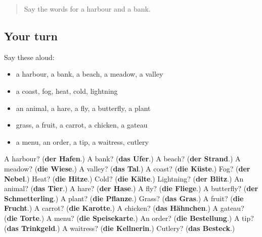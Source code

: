 \label{lesson:GE-R200-second-pass-words-from-chapters-196-200}



\begin{quote}
Say the words for a harbour and a bank.
\end{quote}

\subsection*{Your turn}
Say these aloud:

\begin{itemize}
\raggedright
  \item a harbour, a bank, a beach, a meadow, a valley
  \item a coast, fog, heat, cold, lightning
  \item an animal, a hare, a fly, a butterfly, a plant
  \item grass, a fruit, a carrot, a chicken, a gateau
  \item a menu, an order, a tip, a waitress, cutlery
\end{itemize}

\begin{tcolorbox}[breakable,colback=teal!4,colframe=teal!35!black,title={Before you move on}]
A harbour? (\textbf{der Hafen}.) A bank? (\textbf{das Ufer}.) A beach? (\textbf{der Strand}.) A meadow? (\textbf{die Wiese}.) A valley? (\textbf{das Tal}.) A coast? (\textbf{die Küste}.) Fog? (\textbf{der Nebel}.) Heat? (\textbf{die Hitze}.) Cold? (\textbf{die Kälte}.) Lightning? (\textbf{der Blitz}.) An animal? (\textbf{das Tier}.) A hare? (\textbf{der Hase}.) A fly? (\textbf{die Fliege}.) A butterfly? (\textbf{der Schmetterling}.) A plant? (\textbf{die Pflanze}.) Grass? (\textbf{das Gras}.) A fruit? (\textbf{die Frucht}.) A carrot? (\textbf{die Karotte}.) A chicken? (\textbf{das Hähnchen}.) A gateau? (\textbf{die Torte}.) A menu? (\textbf{die Speisekarte}.) An order? (\textbf{die Bestellung}.) A tip? (\textbf{das Trinkgeld}.) A waitress? (\textbf{die Kellnerin}.) Cutlery? (\textbf{das Besteck}.)
\end{tcolorbox}
